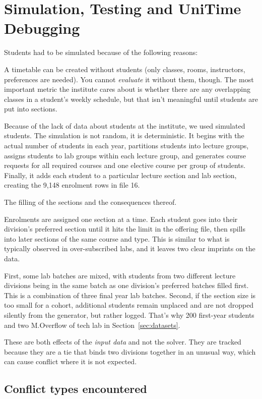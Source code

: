 \section{Simulation, Testing and UniTime Debugging}
\label{sec:simulation}

Students had to be simulated because of the following reasons:

A timetable can be created without students (only classes, rooms, instructors, preferences are needed).
You cannot \emph{evaluate} it without them, though.
The most important metric the institute cares about is whether there are any overlapping classes in a student's weekly schedule, but that isn't meaningful until students are put into sections.

Because of the lack of data about students at the institute, we used simulated students.
The simulation is not random, it is deterministic.
It begins with the actual number of students in each year, partitions students into lecture groups, assigns students to lab groups within each lecture group, and generates course requests for all required courses and one elective course per group of students.
Finally, it adds each student to a particular lecture section and lab section, creating the 9{,}148 enrolment rows in file 16.

The filling of the sections and the consequences thereof.

Enrolments are assigned one section at a time.
Each student goes into their division's preferred section until it hits the limit in the offering file, then spills into later sections of the same course and type.
This is similar to what is typically observed in over-subscribed labs, and it leaves two clear imprints on the data.

First, some lab batches are mixed, with students from two different lecture divisions being in the same batch as one division's preferred batches filled first.
This is a combination of three final year lab batches.
Second, if the section size is too small for a cohort, additional students remain unplaced and are not dropped silently from the generator, but rather logged.
That's why 200 first-year students and two M.Overflow of tech lab in Section~\ref{sec:datasets}.

These are both effects of the \emph{input data} and not the solver.
They are tracked because they are a tie that binds two divisions together in an unusual way, which can cause conflict where it is not expected.

\subsection{Conflict types encountered}

